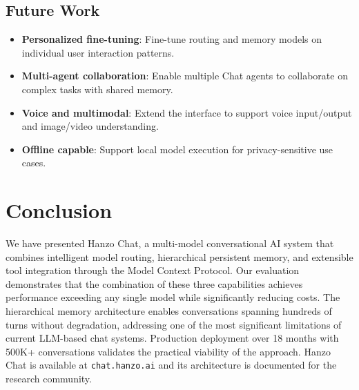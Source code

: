 \documentclass[11pt,twocolumn]{article}
\begin{document}
\subsection{Future Work}

\begin{itemize}[leftmargin=1.1em]
    \item \textbf{Personalized fine-tuning}: Fine-tune routing and memory models on individual user interaction patterns.
    \item \textbf{Multi-agent collaboration}: Enable multiple Chat agents to collaborate on complex tasks with shared memory.
    \item \textbf{Voice and multimodal}: Extend the interface to support voice input/output and image/video understanding.
    \item \textbf{Offline capable}: Support local model execution for privacy-sensitive use cases.
\end{itemize}

\section{Conclusion}
\label{sec:conclusion}

We have presented Hanzo Chat, a multi-model conversational AI system that combines intelligent model routing, hierarchical persistent memory, and extensible tool integration through the Model Context Protocol. Our evaluation demonstrates that the combination of these three capabilities achieves performance exceeding any single model while significantly reducing costs. The hierarchical memory architecture enables conversations spanning hundreds of turns without degradation, addressing one of the most significant limitations of current LLM-based chat systems. Production deployment over 18 months with 500K+ conversations validates the practical viability of the approach. Hanzo Chat is available at \texttt{chat.hanzo.ai} and its architecture is documented for the research community.
\end{document}

